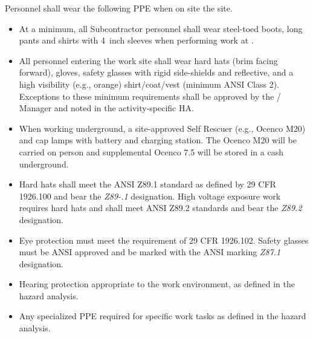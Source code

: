 Personnel shall wear the following PPE when on site the  site.
\begin{itemize}
\item At a minimum, all Subcontractor  personnel shall wear
  steel-toed boots, long pants and shirts with 4~inch sleeves when
  performing  work at . 
  \item All personnel entering the work site  shall wear hard hats (brim facing forward), gloves,
    safety glasses with rigid side-shields and reflective, and a high
    visibility (e.g., orange) shirt/coat/vest (minimum ANSI Class 2).
    Exceptions to these minimum requirements shall be approved by the
    /  Manager and noted in the
    activity-specific HA.
  \item When working underground, a site-approved  Self Rescuer (e.g.,
    Ocenco M20) and cap lamps with battery and charging
    station. The Ocenco M20 will
    be carried on person and supplemental Ocenco 7.5 will be stored in
    a cash underground.
   \item Hard hats shall meet the ANSI Z89.1 standard as defined by 29
     CFR 1926.100 and bear the {\em Z89-.1} designation. High
     voltage exposure work requires hard hats and shall meet ANSI
     Z89.2 standards and bear the {\em Z89.2} designation. 
    \item Eye protection must meet the requirement of 29 CFR
      1926.102. Safety glasses must be ANSI approved and be marked
      with the ANSI marking {\em Z87.1} designation.
    \item Hearing protection appropriate to the work environment, as
      defined in the hazard analysis.
    \item Any specialized PPE required for specific work tasks as
      defined in the hazard analysis. 
\end{itemize}

